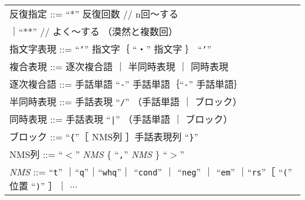 \begin{center}
\begin{supertabular}{|p{13.6cm}|}
    反復指定 ::= ``*''  反復回数    \hfill // n回〜する \\
    \hspace{5zw}｜``**'' 	    \hfill // よく〜する （漠然と複数回） \\
    指文字表現 ::= ``{\tt '}''  指文字｛ ``・''  指文字 ｝ ``{\tt '}''  \\
    複合表現 ::= 逐次複合語 ｜ 半同時表現 ｜ 同時表現 \\
    逐次複合語 ::= 手話単語 ``{\tt -}''  手話単語｛``{\tt -}''  手話単語｝ \\
    半同時表現 ::= 手話表現 ``{\tt /}'' （手話単語 ｜ ブロック） \\ 
    同時表現 ::= 手話表現 ``\verb+|+'' （手話単語 ｜ ブロック） \\
    ブロック ::= ``{\tt\{}''［ NMS列 ］手話表現列 ``{\tt\}}'' \\
    NMS列 ::= ``$<$'' {\it NMS} \{ ``{\tt ,}'' {\it NMS} \} ``$>$'' \\
    {\it NMS} ::= ``{\tt t}'' ｜``{\tt q}''｜``{\tt whq}''｜
    ``{\tt cond}'' ｜ ``{\tt neg}'' 
     ｜ ``{\tt em}''
    ｜``{\tt rs}''［ ``{\tt (}'' 位置 ``{\tt )}'' ］｜ $\cdots$ \\
\end{supertabular}
\end{center}

\newlength{\elem}
\setlength{\elem}{8zw}
\newlength{\example}
\setlength{\example}{10zw}
\newlength{\note}
\setlength{\note}{6.8cm}

